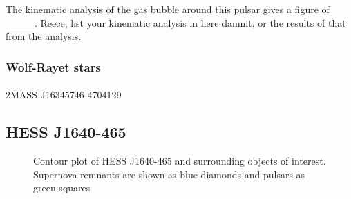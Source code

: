 \documentclass[a4paper, titlepage, oneside]{article}
\begin{document}
\begin{multicols}{2}
The kinematic analysis of the gas bubble around this pulsar gives a figure of \_\_\_\_. Reece, list your kinematic analysis in here damnit, or the results of that from the analysis.

\subsubsection{Wolf-Rayet stars}
\paragraph{}
2MASS J16345746-4704129

\subsection{HESS J1640-465}

\begin{figure}[H]
  \centering
  \caption{Contour plot of HESS J1640-465 and surrounding objects of interest. Supernova remnants are shown as blue diamonds and pulsars as green squares}
  \label{fig:hess40}
\end{figure}


\end{multicols}
\end{document}
